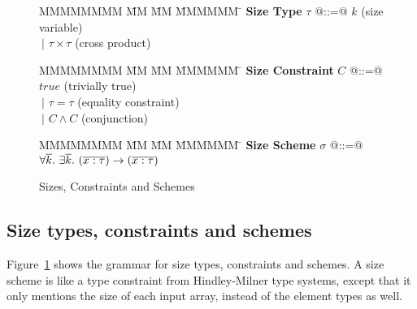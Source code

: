 


\begin{figure}
\begin{tabbing}
MMMMMMMM \= MM  \= MM \= MMMMMM \= \kill
\textbf{Size Type}
\> $\tau$   \> @::=@  \> $k$                  \> (size variable)       \\
\>          \> $~|$   \> $\tau \times \tau$   \> (cross product)
\end{tabbing}

\begin{tabbing}
MMMMMMMM \= MM  \= MM \= MMMMMM \= \kill
\textbf{Size Constraint}
\> $C$      \> @::=@  \> $true$               \> (trivially true)      \\
\>          \> $~|$   \> $\tau = \tau$        \> (equality constraint) \\
\>          \> $~|$   \> $C \wedge C$         \> (conjunction)
\end{tabbing}

\begin{tabbing}
MMMMMMMM \= MM  \= MM \= MMMMMM \= \kill
\textbf{Size Scheme}
\> $\sigma$ \> @::=@  
        \> $\forall \overline{k}.~ \exists \overline{k}.~ (\overline{ x : \tau }) \to (\overline{x : \tau})$
\end{tabbing}

\caption{Sizes, Constraints and Schemes}
\label{f:constraints}
\end{figure}


\newcommand{\constr}[1]{\llbracket #1 \rrbracket}


\subsection{Size types, constraints and schemes}
\label{s:SizeTypes}
Figure~\ref{f:constraints} shows the grammar for size types, constraints and schemes. A size scheme is like a type constraint from Hindley-Milner type systems, except that it only mentions the size of each input array, instead of the element types as well.

